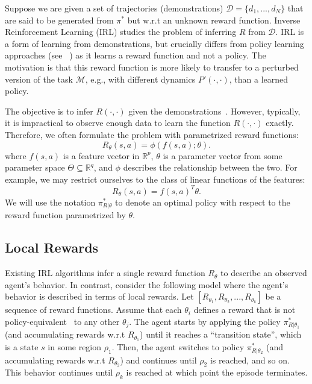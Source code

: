 



















\iffalse
Suppose we are given a set of trajectories (demonstrations) $\mathcal{D}=\{d_1,...,d_N\}$ that are said to be generated from $\pi^*$ but w.r.t an unknown reward function.
Inverse Reinforcement Learning (IRL) studies the problem of inferring $R$ from $\mathcal{D}$.
IRL is a form of learning from demonstrations, but crucially differs from policy learning approaches (see ~\cite{schaal1997learning}) as it learns a reward function and not a policy.
The motivation is that this reward function is more likely to transfer to a perturbed version of the task $\mathcal{M}$, e.g., with different dynamics $P'(\cdot,\cdot)$, than a learned policy.



The objective is to infer $R(\cdot,\cdot)$ given the demonstrations~\cite{DBLP:conf/icml/NgHR99,DBLP:conf/aaai/ZiebartMBD08, coates2008learning}.
However, typically, it is impractical to observe enough data to learn the function $R(\cdot,\cdot)$ exactly.
Therefore, we often formulate the problem with parametrized reward functions:
\[
R_{\theta}(s,a) = \phi(f(s,a);\theta).
\]
where $f(s,a)$ is a feature vector in $\mathbb{R}^p$, $\theta$ is a parameter vector from some parameter space $\Theta \subseteq \mathbb{R}^q$, and $\phi$ describes the relationship between the two.
For example, we may restrict ourselves to the class of linear functions of the features:
\[
R_{\theta}(s,a) = f(s,a)^T\theta.
\]
We will use the notation $\pi_{R | \theta}^*$ to denote an optimal policy with respect to the reward function parametrized by $\theta$.

\subsection{Local Rewards}
Existing IRL algorithms infer a single reward function $R_{\theta}$ to describe an observed agent's behavior.
In contrast, consider the following model where the agent's behavior is described in terms of local rewards.
Let $[R_{\theta_1}, R_{\theta_2}, ..., R_{\theta_k}]$ be a sequence of reward functions. 
Assume that each $\theta_i$ defines a reward that is not policy-equivalent~\cite{DBLP:conf/icml/NgHR99} to any other $\theta_j$. 
The agent starts by applying the policy $\pi_{R | \theta_1}^*$ (and accumulating rewards w.r.t $R_{\theta_1}$) until it reaches a ``transition state'', which is a state $s$ in some region $\rho_1$. 
Then, the agent switches to policy $\pi_{R | \theta_2}^*$ (and accumulating rewards w.r.t $R_{\theta_2}$) and continues until $\rho_2$ is reached, and so on.
This behavior continues until $\rho_k$ is reached at which point the episode terminates.


